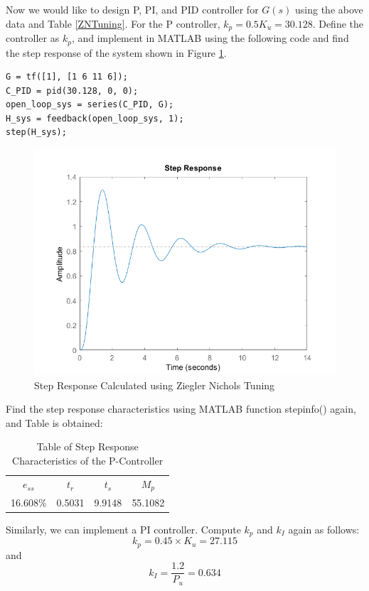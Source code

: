 \documentclass[a4paper, twocolumn, titlepage, 10pt]{article}
\begin{document}
	Now we would like to design P, PI, and PID controller for $G(s)$ using the above data and Table \ref{ZNTuning}. For the P controller, $k_p = 0.5K_u = 30.128$. Define the controller as $k_p$, and implement in MATLAB using the following code and find the step response of the system shown in Figure \ref{step_p_zn}.
	\begin{lstlisting}[frame=single, numbers=none]
G = tf([1], [1 6 11 6]);
C_PID = pid(30.128, 0, 0);
open_loop_sys = series(C_PID, G);
H_sys = feedback(open_loop_sys, 1);
step(H_sys);
	\end{lstlisting}
	\begin{figure}[H]
		\centering
		\includegraphics[width=\linewidth]{Step_P_ZNTuning}
		\caption{Step Response Calculated using Ziegler Nichols Tuning}
		\label{step_p_zn}
	\end{figure}
	
	Find the step response characteristics using MATLAB function stepinfo() again, and Table is obtained:
	\begin{table}[H]
		\centering
		\begin{tabular}{c c c c}
			$e_{ss}$ & $t_r$ & $t_s$ & $M_p$ \\
			16.608\% & 0.5031 & 9.9148 & 55.1082
		\end{tabular}
		\caption{Table of Step Response Characteristics of the P-Controller}
		\label{steptable_p_zn}
	\end{table}

	Similarly, we can implement a PI controller. Compute $k_p$ and $k_I$ again as follows:
	$$
		k_p = 0.45\times K_u = 27.115
	$$
	and
	$$
		k_I = \frac{1.2}{P_u} = 0.634
	$$
	
\end{document}
